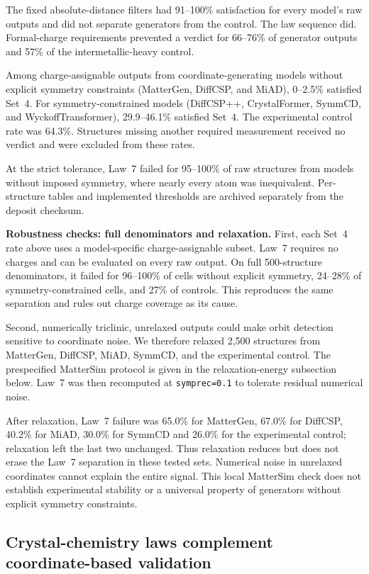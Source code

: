 The fixed absolute-distance filters had 91--100\% satisfaction for every model's
raw outputs and did not separate generators from the control. The law sequence
did. Formal-charge requirements prevented a verdict for 66--76\% of generator
outputs and 57\% of the intermetallic-heavy control.

Among charge-assignable outputs from coordinate-generating models without
explicit symmetry constraints (MatterGen, DiffCSP, and MiAD), 0--2.5\% satisfied
Set~4. For symmetry-constrained models (DiffCSP++, CrystalFormer, SymmCD, and
WyckoffTransformer), 29.9--46.1\% satisfied Set~4. The experimental control rate
was 64.3\%. Structures missing another required measurement received no verdict
and were excluded from these rates.

At the strict tolerance, Law~7 failed for 95--100\% of raw structures from
models without imposed symmetry, where nearly every atom was inequivalent.
Per-structure tables and implemented thresholds are archived separately from the
deposit checksum.

\textbf{Robustness checks: full denominators and relaxation.} First, each
Set~4 rate above uses a model-specific charge-assignable subset. Law~7 requires
no charges and can be evaluated on every raw output. On full 500-structure
denominators, it failed for 96--100\% of cells without explicit symmetry, 24--28\%
of symmetry-constrained cells, and 27\% of controls. This reproduces the same
separation and rules out charge coverage as its cause.

Second, numerically triclinic, unrelaxed outputs could make orbit detection
sensitive to coordinate noise. We therefore relaxed 2{,}500 structures from
MatterGen, DiffCSP, MiAD, SymmCD, and the experimental control. The prespecified
MatterSim protocol is given in the relaxation-energy subsection below. Law~7 was
then recomputed at \texttt{symprec=0.1} to tolerate residual numerical noise.

After relaxation, Law~7 failure was 65.0\% for MatterGen, 67.0\% for DiffCSP,
40.2\% for MiAD, 30.0\% for SymmCD and 26.0\% for the experimental control;
relaxation left the last two unchanged. Thus relaxation
reduces but does not erase the Law~7 separation in these tested sets. Numerical
noise in unrelaxed coordinates cannot explain the entire signal. This local
MatterSim check does not establish experimental stability or a universal
property of generators without explicit symmetry constraints.

\subsection{Crystal-chemistry laws complement coordinate-based validation}

